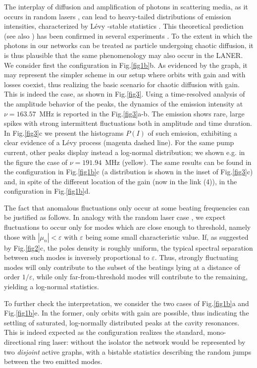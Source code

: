 \documentclass[aps,prl,twocolumn,showpacs,amsmath,amssymb,floatfix,superscriptaddress,
]{revtex4-1}
\begin{document}
The interplay of diffusion and amplification of photons in scattering media, as it occurs in random lasers \cite{Cao2003,Wiersma2008}, can lead to heavy-tailed distributions of emission intensities, characterized by  L\'evy -stable statistics \cite{uchaikin1999}. This theoretical prediction \cite{Lepri2007} 
(see also \cite{Lepri2013,raposo2015analytical}) has been confirmed in several experiments \citep{Ignesti2013,Uppu2014,gomes2016observation}.
To the extent in which the photons in our networks can be treated as
particle undergoing chaotic diffusion, it is thus plausible that 
the same phenomenology may also occur in the LANER. We consider first the configuration in Fig.\ref{fig1b}b. As evidenced by the graph, it may represent the simpler scheme in our setup where orbits with gain and with losses coexist, thus realizing the basic scenario for chaotic diffusion with gain. This is indeed the case, as shown in Fig.\ref{fig3}. Using a time-resolved analysis of the amplitude behavior of the peaks, the dynamics of the emission intensity at $\nu=163.57$~MHz is reported in the Fig.\ref{fig3}a-b. The emission shows rare, large spikes with strong intermittent
fluctuations both in amplitude and time duration. In Fig.\ref{fig3}c we present the histograms $P(I)$ of such emission, exhibiting a clear evidence of a L\'evy process (magenta dashed line). For the same pump current, other peaks display instead a log-normal distribution; we shown e.g. in the figure the case of $\nu=191.94$~MHz (yellow). The same results can be found in the configuration in Fig.\ref{fig1b}c (a distribution is shown in the inset of Fig.\ref{fig3}c) and, in spite of the different location of the gain (now in the link (4)), in the configuration in Fig.\ref{fig1b}d.

The fact that anomalous fluctuations only occur at some beating frequencies can be justified as follows. In analogy with the random laser case \cite{Lepri2007}, 
we expect fluctuations to occur only for modes which are close enough to threshold, 
namely those with $|\mu_n|<\varepsilon$ with $\varepsilon$ being some small characteristic value. If, as suggested by Fig.\ref{fig2}c, the poles density is roughly uniform, the typical spectral separation between such modes is inversely proportional to  $\varepsilon$. Thus, strongly fluctuating modes will only 
contribute to the subset of the beatings lying at a distance of order 
$1/\varepsilon$, while only far-from-threshold modes will contribute 
to the remaining, yielding a log-normal statistics.

To further check the interpretation, we consider the two cases of Fig.\ref{fig1b}a and Fig.\ref{fig1b}e. In the former, only orbits with gain are possible, thus indicating the settling of saturated, log-normally distributed peaks at the cavity resonances. This is indeed expected as the configuration realizes the standard, mono-directional ring laser: without the isolator the network would be represented by two {\it disjoint} active graphs, with a bistable statistics describing the random jumps between the two emitted modes. 
\end{document}
